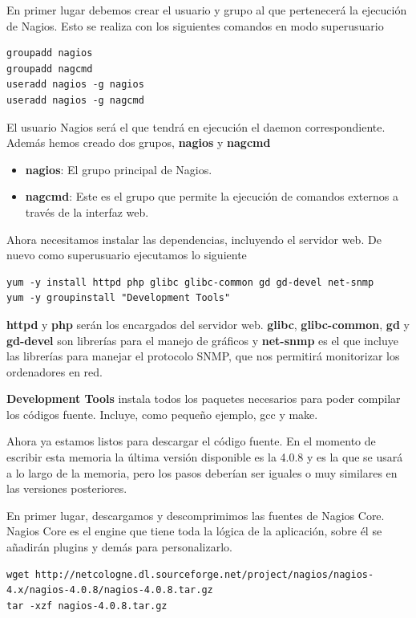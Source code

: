 \documentclass[11pt,a4paper]{article}
\begin{document}
En primer lugar debemos crear el usuario y grupo al que pertenecerá la ejecución de Nagios. Esto se realiza con los siguientes comandos en modo superusuario

\begin{verbatim}
groupadd nagios
groupadd nagcmd
useradd nagios -g nagios
useradd nagios -g nagcmd
\end{verbatim}

El usuario Nagios será el que tendrá en ejecución el daemon correspondiente. Además hemos creado dos grupos, \textbf{nagios} y \textbf{nagcmd}

\begin{itemize}
\item \textbf{nagios}: El grupo principal de Nagios.
\item \textbf{nagcmd}: Este es el grupo que permite la ejecución de comandos externos a través de la interfaz web.
\end{itemize}

Ahora necesitamos instalar las dependencias, incluyendo el servidor web. De nuevo como superusuario ejecutamos lo siguiente

\begin{verbatim}
yum -y install httpd php glibc glibc-common gd gd-devel net-snmp
yum -y groupinstall "Development Tools"
\end{verbatim}

\textbf{httpd} y \textbf{php} serán los encargados del servidor web. \textbf{glibc}, \textbf{glibc-common}, \textbf{gd} y \textbf{gd-devel} son librerías para el manejo de gráficos y \textbf{net-snmp} es el que incluye las librerías para manejar el protocolo SNMP, que nos permitirá monitorizar los ordenadores en red.

\textbf{Development Tools} instala todos los paquetes necesarios para poder compilar los códigos fuente. Incluye, como pequeño ejemplo, gcc y make.

Ahora ya estamos listos para descargar el código fuente. En el momento de escribir esta memoria la última versión disponible es la 4.0.8 y es la que se usará a lo largo de la memoria, pero los pasos deberían ser iguales o muy similares en las versiones posteriores.

En primer lugar, descargamos y descomprimimos las fuentes de Nagios Core. Nagios Core es el engine que tiene toda la lógica de la aplicación, sobre él se añadirán plugins y demás para personalizarlo.

\begin{verbatim}
wget http://netcologne.dl.sourceforge.net/project/nagios/nagios-4.x/nagios-4.0.8/nagios-4.0.8.tar.gz
tar -xzf nagios-4.0.8.tar.gz
\end{verbatim}
\end{document}
